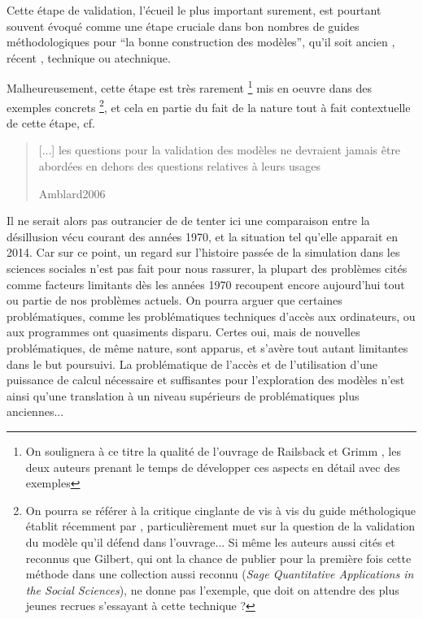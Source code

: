 Cette étape de validation, l'écueil le plus important surement, est pourtant souvent évoqué comme une étape cruciale dans bon nombres de guides méthodologiques pour \enquote{la bonne construction des modèles}, qu'il soit ancien \autocite[195]{Beshers1965} \autocite{Naylor1966, Naylor1967}, récent \autocite{Amblard2006, Gilbert2008}, technique ou atechnique. 

Malheureusement, cette étape est très rarement \footnote{On soulignera à ce titre la qualité de l'ouvrage de Railsback et Grimm \autocite{Railsback2012}, les deux auteurs prenant le temps de développer ces aspects en détail avec des exemples} mis en oeuvre dans des exemples concrets \footnote{On pourra se référer à la critique cinglante de \autocite{Manzo2007a} vis à vis du guide méthologique établit récemment par \autocite{Gilbert2008}, particulièrement muet sur la question de la validation du modèle qu'il défend dans l'ouvrage... Si même les auteurs aussi cités et reconnus que Gilbert, qui ont la chance de publier pour la première fois cette méthode dans une collection aussi reconnu (\textit{Sage Quantitative Applications in the Social Sciences}), ne donne pas l'exemple, que doit on attendre des plus jeunes recrues s'essayant à cette technique ?}, et cela en partie du fait de la nature tout à fait contextuelle de cette étape, cf.\blockquote[Amblard2006]{[...] les questions pour  la validation des modèles ne devraient jamais être abordées en dehors des questions relatives à leurs usages}

Il ne serait alors pas outrancier de de tenter ici une comparaison entre la désillusion vécu courant des années 1970, et la situation tel qu'elle apparait en 2014. Car sur ce point, un regard sur l'histoire passée de la simulation dans les sciences sociales n'est pas fait pour nous rassurer, la plupart des problèmes cités comme facteurs limitants dès les années 1970 recoupent encore aujourd'hui tout ou partie de nos problèmes actuels. On pourra arguer que certaines problématiques, comme les problématiques techniques d'accès aux ordinateurs, ou aux programmes ont quasiments disparu. Certes oui, mais de nouvelles problématiques, de même nature, sont apparus, et s'avère tout autant limitantes dans le but poursuivi. La problématique de l'accès et de l'utilisation d'une puissance de calcul nécessaire et suffisantes pour l'exploration des modèles n'est ainsi qu'une translation à un niveau supérieurs de problématiques plus anciennes...

